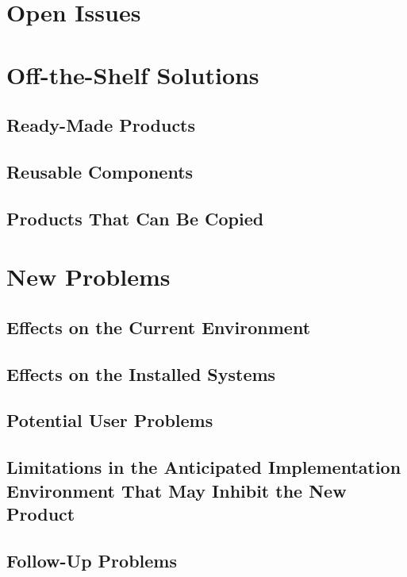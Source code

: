 \documentclass{article}
\begin{document}
\section{Open Issues}

\section{Off-the-Shelf Solutions}

\subsection{Ready-Made Products}


\subsection{Reusable Components}


\subsection{Products That Can Be Copied}


\section{New Problems}

\subsection{Effects on the Current Environment}


\subsection{Effects on the Installed Systems}


\subsection{Potential User Problems}


\subsection{Limitations in the Anticipated Implementation Environment That May Inhibit the New Product}


\subsection{Follow-Up Problems}
\end{document}
